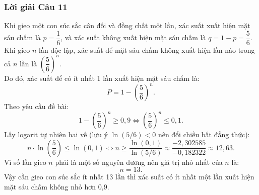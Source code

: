 \subsubsection*{Lời giải Câu 11}
Khi gieo một con súc sắc cân đối và đồng chất một lần, xác suất xuất hiện mặt sáu chấm là $p = \dfrac{1}{6}$, và xác suất không xuất hiện mặt sáu chấm là $q = 1 - p = \dfrac{5}{6}$.\\
Khi gieo $n$ lần độc lập, xác suất để mặt sáu chấm không xuất hiện lần nào trong cả $n$ lần là $\left(\dfrac{5}{6}\right)^n$.\\
Do đó, xác suất để có ít nhất 1 lần xuất hiện mặt sáu chấm là:
\[
P = 1 - \left(\frac{5}{6}\right)^n.
\]
Theo yêu cầu đề bài:
\[
1 - \left(\frac{5}{6}\right)^n \ge 0{,}9 \iff \left(\frac{5}{6}\right)^n \le 0{,}1.
\]
Lấy logarit tự nhiên hai vế (lưu ý $\ln(5/6) < 0$ nên đổi chiều bất đẳng thức):
\[
n \cdot \ln\left(\frac{5}{6}\right) \le \ln(0{,}1) \iff n \ge \frac{\ln(0{,}1)}{\ln(5/6)} \approx \frac{-2{,}302585}{-0{,}182322} \approx 12{,}63.
\]
Vì số lần gieo $n$ phải là một số nguyên dương nên giá trị nhỏ nhất của $n$ là:
\[
n = 13.
\]
Vậy cần gieo con súc sắc ít nhất 13 lần thì xác suất có ít nhất một lần xuất hiện mặt sáu chấm không nhỏ hơn 0,9.
